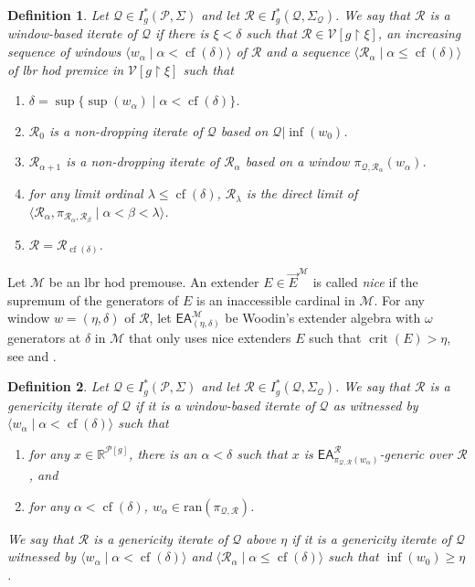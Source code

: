 \documentclass{amsart}
\newtheorem{dfn}{Definition}[section]
\newcommand{\uphar}{\mathbin{\upharpoonright}}
\DeclareMathOperator{\cf}{cf}
\DeclareMathOperator{\crit}{crit}
\begin{document}
\begin{dfn}
Let $\mathcal{Q}\in I^*_g(\mathcal{P}, \Sigma)$ and let $\mathcal{R}\in I^*_g(\mathcal{Q}, \Sigma_{\mathcal{Q}})$.
We say that $\mathcal{R}$ is a \emph{window-based iterate of $\mathcal{Q}$} if there is $\xi<\delta$ such that $\mathcal{R}\in\mathcal{V}[g\uphar\xi]$, an increasing sequence of windows $\langle w_{\alpha}\mid\alpha<\cf(\delta)\rangle$ of $\mathcal{R}$ and a sequence $\langle\mathcal{R}_{\alpha}\mid\alpha\leq\cf(\delta)\rangle$ of lbr hod premice in $\mathcal{V}[g\uphar\xi]$ such that
\begin{enumerate}
    \item $\delta=\sup\{\sup(w_{\alpha})\mid\alpha<\cf(\delta)\}$.
    \item $\mathcal{R}_0$ is a non-dropping iterate of $\mathcal{Q}$ based on $\mathcal{Q}\vert\inf(w_0)$.
    \item $\mathcal{R}_{\alpha+1}$ is a non-dropping iterate of $\mathcal{R}_{\alpha}$ based on a window $\pi_{\mathcal{Q}, \mathcal{R}_{\alpha}}(w_{\alpha})$.
    \item for any limit ordinal $\lambda\leq\cf(\delta)$, $\mathcal{R}_{\lambda}$ is the direct limit of $\langle\mathcal{R}_{\alpha}, \pi_{\mathcal{R}_{\alpha}, \mathcal{R}_{\beta}}\mid\alpha<\beta<\lambda\rangle$.
    \item $\mathcal{R}=\mathcal{R}_{\cf(\delta)}$.
\end{enumerate}
\end{dfn}

Let $\mathcal{M}$ be an lbr hod premouse.
An extender $E\in\vec{E}^{\mathcal{M}}$ is called \emph{nice} if the supremum of the generators of $E$ is an inaccessible cardinal in $\mathcal{M}$.
For any window $w=(\eta, \delta)$ of $\mathcal{R}$, let $\mathsf{EA}^{\mathcal{M}}_{(\eta, \delta)}$ be Woodin's extender algebra with $\omega$ generators at $\delta$ in $\mathcal{M}$ that only uses nice extenders $E$ such that $\crit(E)>\eta$, see \cite{Farah} and \cite{OIMT}.

\begin{dfn}\label{genericity_iteration}
Let $\mathcal{Q}\in I^*_g(\mathcal{P}, \Sigma)$ and let $\mathcal{R}\in I^*_g(\mathcal{Q}, \Sigma_{\mathcal{Q}})$.
We say that $\mathcal{R}$ is a \emph{genericity iterate of $\mathcal{Q}$} if it is a window-based iterate of $\mathcal{Q}$ as witnessed by $\langle w_{\alpha}\mid\alpha<\cf(\delta)\rangle$ such that
\begin{enumerate}
    \item for any $x\in\mathbb{R}^{\mathcal{P}[g]}$, there is an $\alpha<\delta$ such that $x$ is $\mathsf{EA}^{\mathcal{R}}_{\pi_{\mathcal{Q}, \mathcal{R}}(w_{\alpha})}$-generic over $\mathcal{R}$, and
    \item for any $\alpha<\cf(\delta)$, $w_{\alpha}\in\mathrm{ran}(\pi_{\mathcal{Q}, \mathcal{R}})$.
\end{enumerate}
We say that $\mathcal{R}$ is a \emph{genericity iterate of $\mathcal{Q}$ above $\eta$} if it is a genericity iterate of $\mathcal{Q}$ witnessed by $\langle w_{\alpha}\mid\alpha<\cf(\delta)\rangle$ and $\langle\mathcal{R}_{\alpha}\mid\alpha\leq\cf(\delta)\rangle$ such that $\inf(w_0)\geq\eta$.
\end{dfn}
\end{document}
